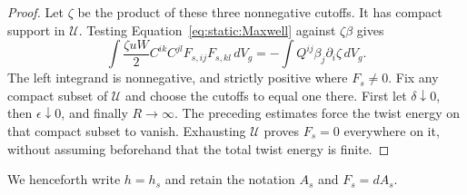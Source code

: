 \begin{proof}
Let $\zeta$ be the product of these three nonnegative cutoffs.
It has compact support in $\mathcal U$. Testing
Equation~\eqref{eq:static:Maxwell} against $\zeta\beta$ gives
\[
 \int\frac{\zeta uW}{2}
          C^{ik}C^{jl}F_{s,ij}F_{s,kl}\,dV_g
 =-\int Q^{ij}\beta_j\partial_i\zeta\,dV_g.
\]
The left integrand is nonnegative, and strictly positive where
$F_s\ne0$. Fix any compact subset of $\mathcal U$ and choose
the cutoffs to equal one there. First let $\delta\downarrow0$,
then $\epsilon\downarrow0$, and finally $R\to\infty$.
The preceding estimates force the twist energy on that compact
subset to vanish. Exhausting $\mathcal U$ proves $F_s=0$
everywhere on it, without assuming beforehand that the total twist
energy is finite.
\end{proof}

We henceforth write $h=h_s$ and retain the notation $A_s$ and $F_s=dA_s$.


